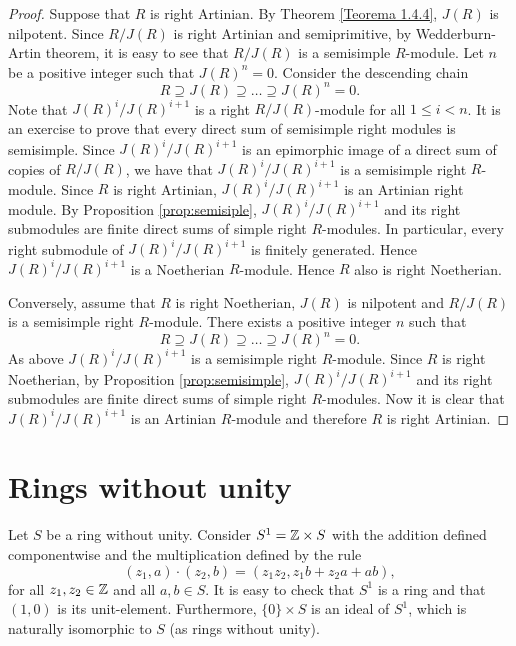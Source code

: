 \begin{proof}
Suppose that $R$ is right Artinian. By Theorem \ref{Teorema 1.4.4}, $J(R)$ is nilpotent. Since $R/J(R)$ is right Artinian and semiprimitive, by Wedderburn-Artin theorem, it is easy to see that  $R/J(R)$ is a semisimple $R$-module. Let $n$ be a positive integer such that $J(R)^n=0$. Consider the descending chain
\[ R\supseteq J(R)\supseteq \dots\supseteq J(R)^n=0.\]
Note that $J(R)^{i}/J(R)^{i+1}$ is a right $R/J(R)$-module for all $1\leq i<n$. It is an exercise to prove that every direct sum of semisimple right modules is semisimple. Since $J(R)^{i}/J(R)^{i+1}$ is an epimorphic image of a direct sum of copies of $R/J(R)$, we have that $J(R)^{i}/J(R)^{i+1}$ is a semisimple right $R$-module. Since $R$ is right Artinian, $J(R)^{i}/J(R)^{i+1}$ is an Artinian right module. By Proposition \ref{prop:semisiple},  $J(R)^{i}/J(R)^{i+1}$ and its right submodules are finite direct sums of simple right $R$-modules. In particular, every right submodule of $J(R)^{i}/J(R)^{i+1}$ is finitely generated. Hence $J(R)^{i}/J(R)^{i+1}$ is a Noetherian $R$-module. Hence $R$ also is right Noetherian. 

Conversely, assume that $R$ is right Noetherian, $J(R)$ is nilpotent and $R/J(R)$ is a semisimple right $R$-module. There exists a positive integer $n$ such that 
\[ R\supseteq J(R)\supseteq \dots\supseteq J(R)^n=0.\]
As above $J(R)^{i}/J(R)^{i+1}$ is a semisimple right $R$-module. Since $R$ is right Noetherian, by Proposition \ref{prop:semisimple}, $J(R)^{i}/J(R)^{i+1}$ and its right submodules are finite direct sums of simple right $R$-modules. Now it is clear that $J(R)^{i}/J(R)^{i+1}$ is an Artinian $R$-module and therefore $R$ is right Artinian.
\end{proof}

\section{Rings without unity}

Let $S$ be a ring without unity. Consider $S^1=\mathbb{Z}\times S$ with the addition defined componentwise and the multiplication defined by
the rule
$$(z_1,a)\cdot (z_2,b)=(z_1z_2,z_1b+z_2a+ab),
$$
for all $z_1,z_2\in\mathbb{Z}$ and all $a,b\in S$. It is easy to check that $S^1$ is a ring and that $(1,0)$ is its unit-element. Furthermore, 
$\{0\}\times S$ is an ideal of $S^1$, which is naturally isomorphic to $S$ (as rings without unity).

